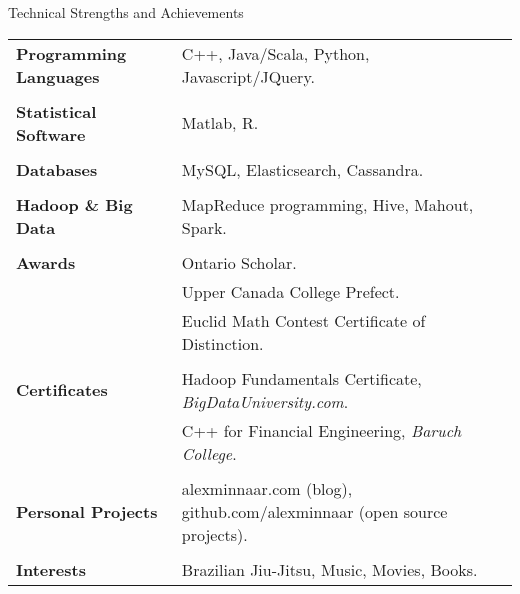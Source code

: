 \documentclass{resume}
\begin{document}

\begin{rSection}{Technical Strengths and Achievements}

\begin{tabular}{ @{} >{\bfseries}l @{\hspace{6ex}} l }
Programming Languages & C++, Java/Scala, Python, Javascript/JQuery.  \\ \\
Statistical Software & Matlab, R.\\ \\
Databases & MySQL, Elasticsearch, Cassandra. \\ \\
Hadoop \& Big Data & MapReduce programming, Hive, Mahout, Spark. \\ \\
Awards & Ontario Scholar.\\ & Upper Canada College Prefect.\\ & Euclid Math Contest Certificate of Distinction.\\ \\
Certificates & Hadoop Fundamentals Certificate, \textit{BigDataUniversity.com}.\\
& C++ for Financial Engineering, \textit{Baruch College}.\\ \\
Personal Projects & alexminnaar.com (blog), github.com/alexminnaar (open source projects). \\ \\
Interests & Brazilian Jiu-Jitsu, Music, Movies, Books.
\end{tabular}

\end{rSection}

\end{document}
